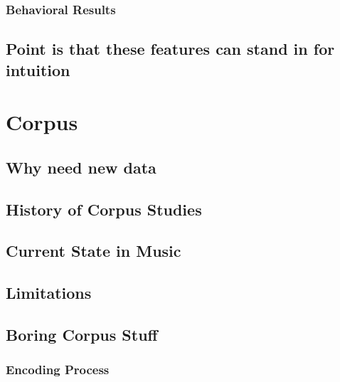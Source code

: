 \documentclass[]{book}
\theoremstyle{definition}
\theoremstyle{definition}
\theoremstyle{definition}
\theoremstyle{remark}
\begin{document}
\hypertarget{behavioral-results}{%
\subsection{Behavioral Results}\label{behavioral-results}}

\hypertarget{point-is-that-these-features-can-stand-in-for-intuition}{%
\section{Point is that these features can stand in for
intuition}\label{point-is-that-these-features-can-stand-in-for-intuition}}

\hypertarget{corpus}{%
\chapter{Corpus}\label{corpus}}

\hypertarget{why-need-new-data}{%
\section{Why need new data}\label{why-need-new-data}}

\hypertarget{history-of-corpus-studies}{%
\section{History of Corpus Studies}\label{history-of-corpus-studies}}

\hypertarget{current-state-in-music}{%
\section{Current State in Music}\label{current-state-in-music}}

\hypertarget{limitations}{%
\section{Limitations}\label{limitations}}

\hypertarget{boring-corpus-stuff}{%
\section{Boring Corpus Stuff}\label{boring-corpus-stuff}}

\hypertarget{encoding-process}{%
\subsection{Encoding Process}\label{encoding-process}}
\end{document}
